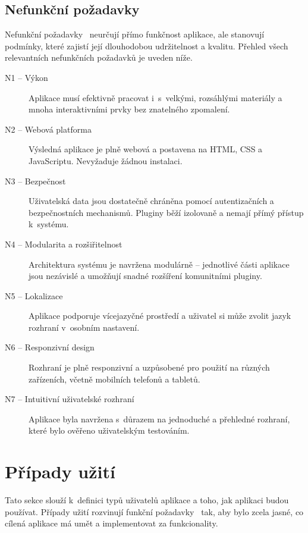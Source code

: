 \subsection{Nefunkční požadavky}
Nefunkční požadavky~\cite{uml_2007} neurčují přímo funkčnost aplikace, ale stanovují podmínky, které zajistí její dlouhodobou udržitelnost a kvalitu. 
Přehled všech relevantních nefunkčních požadavků je uveden níže.


\begin{description}
    \item[N1 -- Výkon]
    Aplikace musí efektivně pracovat i~s~velkými, rozsáhlými materiály a mnoha interaktivními prvky bez znatelného zpomalení.

    \item[N2 -- Webová platforma]
    Výsledná aplikace je plně webová a postavena na HTML, CSS a JavaScriptu. Nevyžaduje žádnou instalaci.

    \item[N3 -- Bezpečnost]
    Uživatelská data jsou dostatečně chráněna pomocí autentizačních a bezpečnostních mechanismů. Pluginy běží izolovaně a nemají přímý přístup k~systému.

    \item[N4 -- Modularita a rozšiřitelnost]
    Architektura systému je navržena modulárně -- jednotlivé části aplikace jsou nezávislé a umožňují snadné rozšíření komunitními pluginy.

    \item[N5 -- Lokalizace]
    Aplikace podporuje vícejazyčné prostředí a uživatel si může zvolit jazyk rozhraní v~osobním nastavení.

    \item[N6 -- Responzivní design]
    Rozhraní je plně responzivní a uzpůsobené pro použití na různých zařízeních, včetně mobilních telefonů a tabletů.

    \item[N7 -- Intuitivní uživatelské rozhraní]
    Aplikace byla navržena s~důrazem na jednoduché a přehledné rozhraní, které bylo ověřeno uživatelským testováním.

\end{description}


\section{Případy užití}\label{chapter:analyza/uzivatelskePripady}

Tato sekce slouží k~definici typů uživatelů aplikace a toho, jak aplikaci budou používat.
Případy užití rozvinují funkční požadavky~\cite{uml_2007} tak, aby bylo zcela jasné, co cílená aplikace má umět a implementovat za funkcionality.

